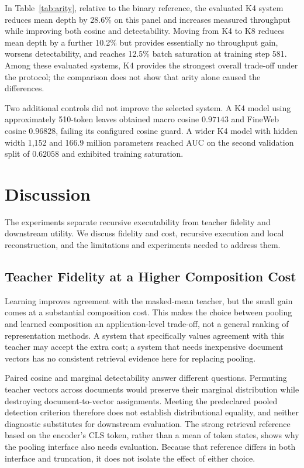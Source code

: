 \documentclass[10pt]{article}
\begin{document}
In Table~\ref{tab:arity}, relative to the binary reference, the evaluated K4 system reduces mean depth by
28.6\% on this panel and increases measured throughput while improving both
cosine and detectability. Moving from K4 to K8 reduces mean depth by a further
10.2\% but provides essentially no throughput gain, worsens detectability, and
reaches 12.5\% batch saturation at training step 581. Among these evaluated
systems, K4 provides the strongest overall trade-off under the protocol; the
comparison does not show that arity alone caused the differences.

Two additional controls did not improve the selected system. A K4 model using
approximately 510-token leaves obtained macro cosine \(0.97143\) and FineWeb
cosine \(0.96828\), failing its configured cosine guard. A wider K4 model with
hidden width 1,152 and 166.9 million parameters reached AUC on the second validation split of
\(0.62058\) and exhibited training saturation.

\section{Discussion}
\label{sec:discussion}

The experiments separate recursive executability from teacher fidelity and
downstream utility. We discuss fidelity and cost, recursive execution and local
reconstruction, and the limitations and experiments needed to address them.

\subsection{Teacher Fidelity at a Higher Composition Cost}

Learning improves agreement with the masked-mean teacher, but the small gain
comes at a substantial composition cost. This makes the choice between pooling
and learned composition an application-level trade-off, not a general ranking
of representation methods. A system that specifically values agreement with
this teacher may accept the extra cost; a system that needs inexpensive document
vectors has no consistent retrieval evidence here for replacing pooling.

Paired cosine and marginal detectability answer different questions. Permuting
teacher vectors across documents would preserve their marginal distribution
while destroying document-to-vector assignments. Meeting the predeclared
pooled detection criterion therefore does not establish distributional equality,
and neither diagnostic substitutes for downstream evaluation. The strong
retrieval reference based on the encoder's CLS token, rather than a mean of
token states, shows why the pooling interface also needs evaluation. Because
that reference differs in both interface and truncation, it does not isolate
the effect of either choice.
\end{document}
